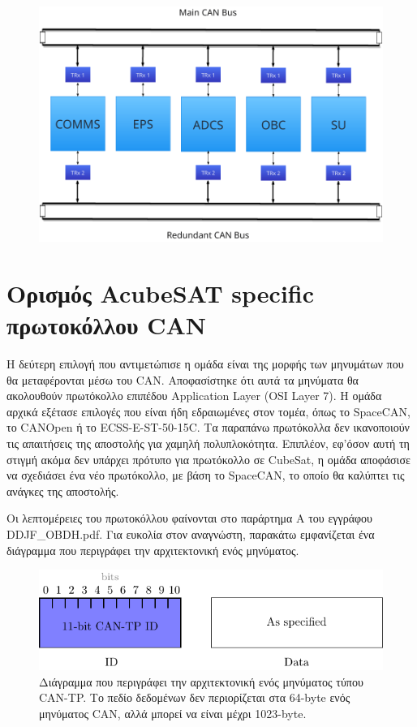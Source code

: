 \documentclass[a4paper,nobib,justified]{tufte-book}
\begin{document}
\begin{figure}[h]
	\includegraphics{media/diagrams/subsystems-on-buses.pdf}
	\label{fig:dual-buses}
\end{figure}

\section{Ορισμός AcubeSAT specific πρωτοκόλλου CAN}
Η δεύτερη επιλογή που αντιμετώπισε η ομάδα είναι της μορφής των μηνυμάτων που θα μεταφέρονται μέσω του CAN. Αποφασίστηκε ότι αυτά τα μηνύματα θα ακολουθούν πρωτόκολλο επιπέδου Application Layer (OSI Layer 7). Η ομάδα αρχικά εξέτασε επιλογές που είναι ήδη εδραιωμένες στον τομέα, όπως το SpaceCAN, το CANOpen ή το ECSS-E-ST-50-15C. Τα παραπάνω πρωτόκολλα δεν ικανοποιούν τις απαιτήσεις της αποστολής για χαμηλή πολυπλοκότητα. Επιπλέον, εφ'όσον αυτή τη στιγμή ακόμα δεν υπάρχει πρότυπο για πρωτόκολλο σε CubeSat, η ομάδα αποφάσισε να σχεδιάσει ένα νέο πρωτόκολλο, με βάση το SpaceCAN, το οποίο θα καλύπτει τις ανάγκες της αποστολής.

Οι λεπτομέρειες του πρωτοκόλλου φαίνονται στο παράρτημα Α του εγγράφου DDJF\_OBDH.pdf. Για ευκολία στον αναγνώστη, παρακάτω εμφανίζεται ένα διάγραμμα που περιγράφει την αρχιτεκτονική ενός μηνύματος.

\begin{figure}
	\includegraphics{media/diagrams/tp-message-structure.pdf}
	\caption{Διάγραμμα που περιγράφει την αρχιτεκτονική ενός μηνύματος τύπου CAN-TP. Το πεδίο δεδομένων δεν περιορίζεται στα 64-byte ενός μηνύματος CAN, αλλά μπορεί να είναι μέχρι 1023-byte.}
	\label{fig:tp-message-structure}
\end{figure}
\end{document}
